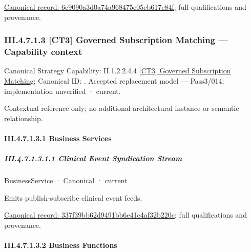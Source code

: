 {\footnotesize \href{../../../../../../../continuum/business/business-function/6c9090a3d0a74a968475e05eb617e84f.md}{Canonical record: 6c9090a3d0a74a968475e05eb617e84f}; full qualifications and provenance.}\par
\subsubsection*{III.4.7.1.3 [CT3] Governed Subscription Matching — Capability context}
\label{navigation:III.4.7.1.3}

{\small Canonical Strategy Capability: II.1.2.2.4.4 \hyperref[element:0f79a2e62740435b9bef0f662838ab16]{[CT3] Governed Subscription Matching}; Canonical ID: \texttt{}. Accepted replacement model — Pass3/014; implementation unverified · current.}\par
Contextual reference only; no additional architectural instance or semantic relationship.\par
\paragraph*{III.4.7.1.3.1 Business Services}
\label{navigation:III.4.7.1.3.1}

\subparagraph*{III.4.7.1.3.1.1 Clinical Event Syndication Stream}
\label{navigation:III.4.7.1.3.1.1}

\label{element:337f39bb62d9491bb6e41c4af32b220c}
{\small BusinessService · Canonical · current}\par

Emits publish-subscribe clinical event feeds.


{\footnotesize \href{../../../../../../../continuum/business/business-service/337f39bb62d9491bb6e41c4af32b220c.md}{Canonical record: 337f39bb62d9491bb6e41c4af32b220c}; full qualifications and provenance.}\par
\paragraph*{III.4.7.1.3.2 Business Functions}
\label{navigation:III.4.7.1.3.2}

